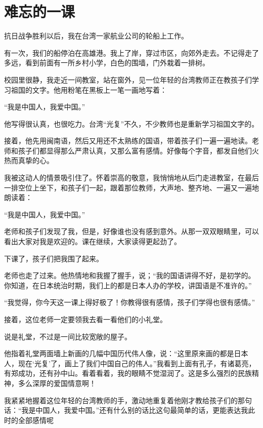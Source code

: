 \documentclass[12pt,UTF-8,openany]{ctexbook}
\begin{document}
\chapter{难忘的一课}

\begin{large}
    
    抗日战争胜利以后，我在台湾一家航业公司的轮船上工作。
    
    有一次，我们的船停泊在高雄港。我上了岸，穿过市区，向郊外走去。不记得走了多远，看到前面有一所乡村小学，白色的围墙，门外栽着一排树。
    
    校园里很静，我走近一间教室，站在窗外，见一位年轻的台湾教师正在教孩子们学习祖国的文字。他用粉笔在黑板上一笔一画地写着：
    
    “我是中国人，我爱中国。”
    
    他写得很认真，也很吃力。台湾“光复”不久，不少教师也是重新学习祖国文字的。
    
    接着，他先用闽南语，然后又用还不太熟练的国语，带着孩子们一遍一遍地读。老师和孩子们都显得那么严肃认真，又那么富有感情。好像每个字音，都发自他们火热而真挚的心。
    
    我被这动人的情景吸引住了。怀着崇高的敬意，我悄悄地从后门走进教室，在最后一排空位上坐下，和孩子们一起，跟着那位教师，大声地、整齐地、一遍又一遍地朗读着：
    
    “我是中国人，我爱中国。”
    
    老师和孩子们发现了我，但是，好像谁也没有感到意外。从那一双双眼睛里，可以看出大家对我是欢迎的。课在继续，大家读得更起劲了。
    
    下课了，孩子们把我围了起来。
    
    老师也走了过来。他热情地和我握了握手，说；“我的国语讲得不好，是初学的。你知道，在日本统治时期，我们上的都是日本人办的学校，讲国语是不准许的。”
    
    “我觉得，你今天这一课上得好极了！你教得很有感情，孩子们学得也很有感情。”
    
    接着，这位老师一定要领我去看一看他们的小礼堂。
    
    说是礼堂，不过是一间比较宽敞的屋子。
    
    他指着礼堂两面墙上新画的几幅中国历代伟人像，说：“这里原来画的都是日本人，现在‘光复’了，画上了我们中国自己的伟人。”我看到上面有孔子，有诸葛亮，有郑成功，还有孙中山。看着看着，我的眼睛不觉湿润了。这是多么强烈的民族精神，多么深厚的爱国情意啊！
    
    我紧紧地握着这位年轻的台湾教师的手，激动地重复着他刚才教给孩子们的那句话：“我是中国人，我爱中国。”还有什么别的话比这句最简单的话，更能表达我此时的全部感情呢
    
\end{large}
\end{document}
